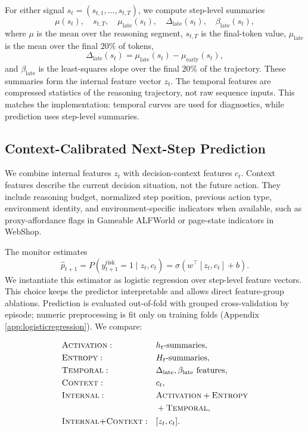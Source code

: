 \documentclass{article}
\theoremstyle{plain}
\theoremstyle{definition}
\theoremstyle{remark}
\begin{document}
For either signal \(s_t=(s_{t,1},\ldots,s_{t,T})\), we compute step-level summaries
\[
    \mu(s_t),\quad s_{t,T},\quad \mu_{\mathrm{late}}(s_t),
    \quad \Delta_{\mathrm{late}}(s_t),\quad \beta_{\mathrm{late}}(s_t),
\]
where \(\mu\) is the mean over the reasoning segment, \(s_{t,T}\) is the final-token value, \(\mu_{\mathrm{late}}\) is the mean over the final \(20\%\) of tokens,
\[
    \Delta_{\mathrm{late}}(s_t)
    =
    \mu_{\mathrm{late}}(s_t)-\mu_{\mathrm{early}}(s_t),
\]
and \(\beta_{\mathrm{late}}\) is the least-squares slope over the final \(20\%\) of the trajectory. These summaries form the internal feature vector \(z_t\). The temporal features are compressed statistics of the reasoning trajectory, not raw sequence inputs. This matches the implementation: temporal curves are used for diagnostics, while prediction uses step-level summaries.

\subsection{Context-Calibrated Next-Step Prediction}
\label{sec:next-step-prediction}

We combine internal features \(z_t\) with decision-context features \(c_t\). Context features describe the current decision situation, not the future action. They include reasoning budget, normalized step position, previous action type, environment identity, and environment-specific indicators when available, such as proxy-affordance flags in Gameable ALFWorld or page-state indicators in WebShop.

The monitor estimates
\[
    \hat{p}_{t+1}
    =
    P(y^{\mathrm{risk}}_{t+1}=1\mid z_t,c_t)
    =
    \sigma(w^\top[z_t,c_t]+b).
\]
We instantiate this estimator as logistic regression over step-level feature vectors. This choice keeps the predictor interpretable and allows direct feature-group ablations. Prediction is evaluated out-of-fold with grouped cross-validation by episode; numeric preprocessing is fit only on training folds (Appendix \ref{app:logisticregression}). We compare:

\[
\begin{aligned}
    &\textsc{Activation}: && h_t\text{-summaries},\\
    &\textsc{Entropy}: && H_t\text{-summaries},\\
    &\textsc{Temporal}: && \Delta_{\mathrm{late}},\beta_{\mathrm{late}}\text{ features},\\
    &\textsc{Context}: && c_t,\\
    &\textsc{Internal}: &&
    \begin{aligned}[t]
        &\textsc{Activation}+\textsc{Entropy}\\
        &+\textsc{Temporal},
    \end{aligned}\\
    &\textsc{Internal+Context}: && [z_t,c_t].
\end{aligned}
\]
\end{document}
